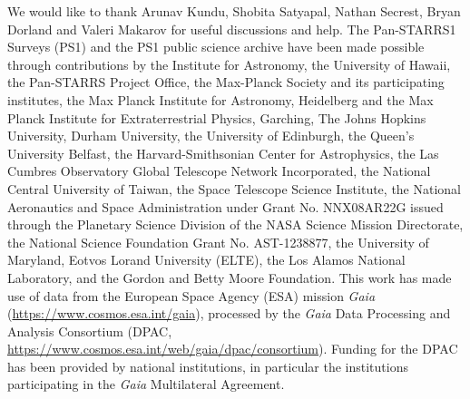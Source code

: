 \documentclass[manuscript]{aastex}
\begin{document}
\acknowledgments

We would like to thank Arunav Kundu, Shobita Satyapal, Nathan Secrest, Bryan Dorland and Valeri Makarov for useful discussions and help.
The Pan-STARRS1 Surveys (PS1) and the PS1 public science archive have been made possible through contributions by the Institute for Astronomy, the University of Hawaii, the Pan-STARRS Project Office, the Max-Planck Society and its participating institutes, the Max Planck Institute for Astronomy, Heidelberg and the Max Planck Institute for Extraterrestrial Physics, Garching, The Johns Hopkins University, Durham University, the University of Edinburgh, the Queen's University Belfast, the Harvard-Smithsonian Center for Astrophysics, the Las Cumbres Observatory Global Telescope Network Incorporated, the National Central University of Taiwan, the Space Telescope Science Institute, the National Aeronautics and Space Administration under Grant No. NNX08AR22G issued through the Planetary Science Division of the NASA Science Mission Directorate, the National Science Foundation Grant No. AST-1238877, the University of Maryland, Eotvos Lorand University (ELTE), the Los Alamos National Laboratory, and the Gordon and Betty Moore Foundation.
This work has made use of data from the European Space Agency (ESA)
mission {\it Gaia} (\url{https://www.cosmos.esa.int/gaia}), processed by
the {\it Gaia} Data Processing and Analysis Consortium (DPAC,
\url{https://www.cosmos.esa.int/web/gaia/dpac/consortium}). Funding
for the DPAC has been provided by national institutions, in particular
the institutions participating in the {\it Gaia} Multilateral Agreement.
\end{document}
